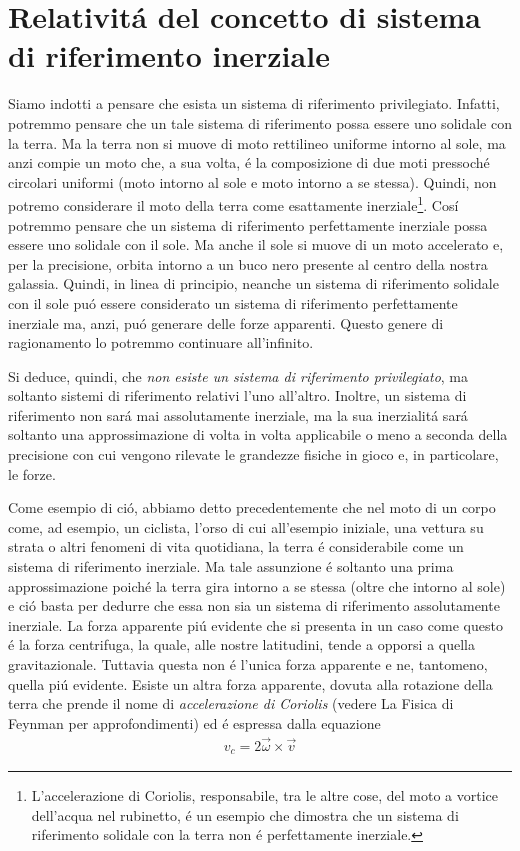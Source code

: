 \documentclass[17pt]{extarticle}
\begin{document}
\section{Relativit\'a del concetto di sistema di riferimento inerziale}

Siamo indotti a pensare che esista un sistema di riferimento privilegiato.
Infatti, potremmo pensare che un tale sistema di riferimento possa essere uno solidale con la terra. Ma la terra non si muove di moto rettilineo uniforme intorno al sole, ma anzi compie un moto che, a sua volta, \'e la composizione di due moti pressoch\'e circolari uniformi (moto intorno al sole e moto intorno a se stessa). Quindi, non potremo considerare il moto della terra come esattamente inerziale\footnote{L'accelerazione di Coriolis, responsabile, tra le altre cose, del moto a vortice dell'acqua nel rubinetto, \'e un esempio che dimostra che un sistema di riferimento solidale con la terra non \'e perfettamente inerziale.}. 
Cos\'i potremmo pensare che un sistema di riferimento perfettamente inerziale possa essere uno solidale con il sole. Ma anche il sole si muove di un moto accelerato e, per la precisione, orbita intorno a un buco nero presente al centro della nostra galassia. Quindi, in linea di principio, neanche un sistema di riferimento solidale con il sole pu\'o essere considerato un sistema di riferimento perfettamente inerziale ma, anzi, pu\'o generare delle forze apparenti. Questo genere di ragionamento lo potremmo continuare all'infinito. 




Si deduce, quindi, che \emph{non esiste un sistema di riferimento privilegiato}, ma soltanto sistemi di riferimento relativi l'uno all'altro. Inoltre, un sistema di riferimento non sar\'a mai assolutamente inerziale, ma la sua inerzialit\'a sar\'a soltanto una approssimazione di volta in volta applicabile o meno a seconda della precisione con cui vengono rilevate le grandezze fisiche in gioco e, in particolare, le forze.

Come esempio di ci\'o, abbiamo detto precedentemente che nel moto di un corpo come, ad esempio, un ciclista, l'orso di cui all'esempio iniziale, una vettura su strata o altri fenomeni di vita quotidiana, la terra \'e considerabile come un sistema di riferimento inerziale. Ma tale assunzione \'e soltanto una prima approssimazione poich\'e la terra gira intorno a se stessa (oltre che intorno al sole) e ci\'o basta per dedurre che essa non sia un sistema di riferimento assolutamente inerziale. La forza apparente pi\'u evidente che si presenta in un caso come questo \'e la forza centrifuga, la quale, alle nostre latitudini, tende a opporsi a quella gravitazionale. Tuttavia questa non \'e l'unica forza apparente e ne, tantomeno, quella pi\'u evidente. Esiste un altra forza apparente, dovuta alla rotazione della terra che prende il nome di \emph{accelerazione di Coriolis} (vedere La Fisica di Feynman per approfondimenti) ed \'e espressa dalla equazione
\begin{eqnarray}
	v_c =2\vec{\omega} \times \vec{v}
\end{eqnarray}
\end{document}
